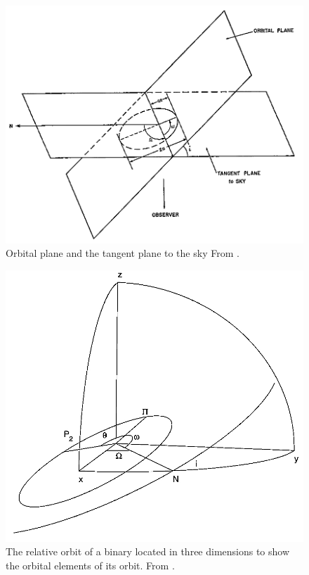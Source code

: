 \documentclass[12pt,preprint]{aastex}
\begin{document}
\pagebreak

\begin{figure}[h]
\begin{center}
\includegraphics[scale=0.575]{Figures/BattenPG8Fig.jpeg}
\caption[Orbital Plane vs Plane of Sky]{ Orbital plane and the tangent plane to the sky  From \citet{batten}. }
\label{fig:OPvsSky}
\end{center}
\end{figure}

\begin{figure}[h]
\begin{center}
\includegraphics[scale=0.5]{Figures/HilditchPG41Fig.jpeg}
\caption[Orbital Elements]{ The relative orbit of a  binary located in three dimensions to show the orbital elements of its orbit.  From \citet{hilditch}. }
\label{fig:orbElements}
\end{center}
\end{figure}
\end{document}
